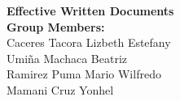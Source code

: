 \documentclass{beamer}
\begin{document}
\begin{frame}{}
\centering
\vspace{1.5cm}

{\Huge \textbf{Effective Written Documents}}\\[1em]



{\normalsize
\textbf{Group Members:} \\[0.5em]
Caceres Tacora Lizbeth Estefany \\ 
Umiña Machaca Beatriz\\
Ramirez Puma Mario Wilfredo\\
Mamani Cruz Yonhel \\

}
\end{frame}





\end{document}
